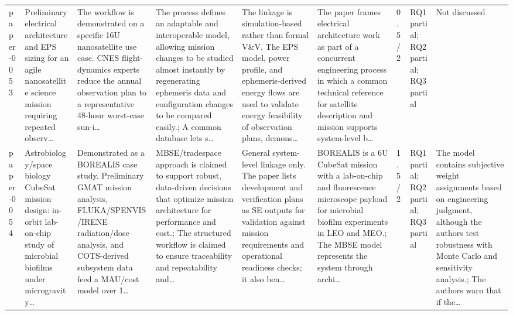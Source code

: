\documentclass[10pt]{article}
\begin{document}
\begin{landscape}
\begin{longtable}{p{1.0cm}p{2.4cm}p{3.1cm}p{3.7cm}p{3.4cm}p{3.1cm}p{1.0cm}p{1.8cm}p{3.4cm}}
paper-0053 & Preliminary electrical architecture and EPS sizing for an agile nanosatellite science mission requiring repeated observ… & The workflow is demonstrated on a specific 16U nanosatellite use case. CNES flight-dynamics experts reduce the annual observation plan to a representative 48-hour worst-case sun-i… & The process defines an adaptable and interoperable model, allowing mission changes to be studied almost instantly by regenerating ephemeris data and configuration changes to be compared easily.; A common database lets s… & The linkage is simulation-based rather than formal V\&V. The EPS model, power profile, and ephemeris-derived energy flows are used to validate energy feasibility of observation plans, demons… & The paper frames electrical architecture work as part of a concurrent engineering process in which a common technical reference for satellite description and mission supports system-level b… & 0.5/2 & RQ1 partial; RQ2 partial; RQ3 partial & Not discussed \\
paper-0054 & Astrobiology/space biology CubeSat mission design: in-orbit lab-on-chip study of microbial biofilms under microgravity… & Demonstrated as a BOREALIS case study. Preliminary GMAT mission analysis, FLUKA/SPENVIS/IRENE radiation/dose analysis, and COTS-derived subsystem data feed a MAU/cost model over 1… & MBSE/tradespace approach is claimed to support robust, data-driven decisions that optimize mission architecture for performance and cost.; The structured workflow is claimed to ensure traceability and repeatability and… & General system-level linkage only. The paper lists development and verification plans as SE outputs for validation against mission requirements and operational readiness checks; it also ben… & BOREALIS is a 6U CubeSat mission with a lab-on-chip and fluorescence microscope payload for microbial biofilm experiments in LEO and MEO.; The MBSE model represents the system through archi… & 1.5/2 & RQ1 partial; RQ2 partial; RQ3 partial & The model contains subjective weight assignments based on engineering judgment, although the authors test robustness with Monte Carlo and sensitivity analysis.; The authors warn that if the… \\

\end{longtable}
\end{landscape}
\end{document}
